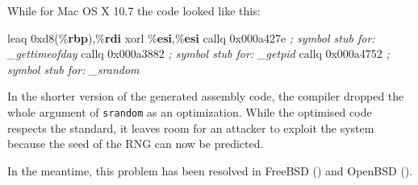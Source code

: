 \documentclass[
  a4paper,
]{report}
\newenvironment{Shaded}{}{}
\newcommand{\BaseNTok}[1]{\textcolor[rgb]{0.25,0.63,0.44}{#1}}
\newcommand{\BuiltInTok}[1]{\textcolor[rgb]{0.00,0.50,0.00}{#1}}
\newcommand{\CommentTok}[1]{\textcolor[rgb]{0.38,0.63,0.69}{\textit{#1}}}
\newcommand{\KeywordTok}[1]{\textcolor[rgb]{0.00,0.44,0.13}{\textbf{#1}}}
\newcommand{\NormalTok}[1]{#1}
\newcommand{\OperatorTok}[1]{\textcolor[rgb]{0.40,0.40,0.40}{#1}}
\begin{document}
\begin{Shaded}
\end{Shaded}

While for Mac OS X 10.7 the code looked like this:

\begin{Shaded}
\begin{Highlighting}[]
\NormalTok{leaq    }\BaseNTok{0xd8}\OperatorTok{(\%}\KeywordTok{rbp}\OperatorTok{),\%}\KeywordTok{rdi}
\NormalTok{xorl    }\OperatorTok{\%}\KeywordTok{esi}\OperatorTok{,\%}\KeywordTok{esi}
\NormalTok{callq   }\BaseNTok{0x000a427e}      \CommentTok{; symbol stub for: \_gettimeofday}
\NormalTok{callq   }\BaseNTok{0x000a3882}      \CommentTok{; symbol stub for: \_getpid}
\NormalTok{callq   }\BaseNTok{0x000a4752}      \CommentTok{; symbol stub for: \_srandom}
\end{Highlighting}
\end{Shaded}

In the shorter version of the generated assembly code, the compiler
dropped the whole argument of \texttt{srandom} as an optimization. While
the optimised code respects the standard, it leaves room for an attacker
to exploit the system because the seed of the RNG can now be predicted.

In the meantime, this problem has been resolved in FreeBSD
() and OpenBSD ().
\end{document}
